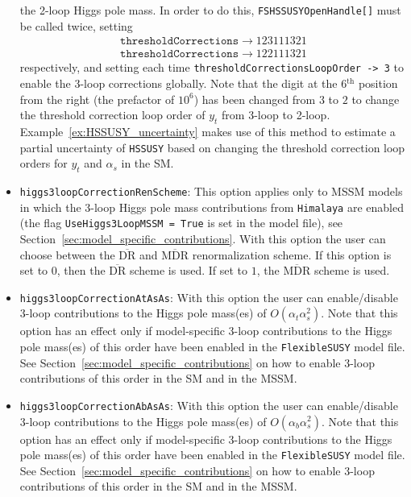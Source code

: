 \documentclass[final,3p,11pt,pdflatex]{elsarticle}
\makeatletter
\newcommand{\modelname}[1]{\texttt{#1}\@\xspace}
\newcommand{\fs}{\texttt{FlexibleSUSY}\@\xspace}
\newcommand{\HSSUSY}{\modelname{HSSUSY}}
\newcommand{\Himalaya}{\texttt{Himalaya}\@\xspace}
\newcommand{\code}[1]{\lstinline|#1|}  %
\newcommand{\ol}[1]{\overline{#1}}
\newcommand{\DRbar}{\ensuremath{\ol{\text{DR}}}\xspace}
\newcommand{\MDRbar}{\ensuremath{\ol{\text{MDR}}}\xspace}
\newcommand{\secref}[1]{Section~\ref{#1}}
\newcommand{\exref}[1]{Example~\ref{#1}}
\def\at{\alpha_t}
\def\ab{\alpha_b}
\def\as{\alpha_s}
\makeatother
\begin{document}
\begin{itemize}
\begin{example}[label=ex:HSSUSY_thresholds]
    the 2-loop Higgs pole mass.  In order to do this,
    \code{FSHSSUSYOpenHandle[]} must be called twice, setting
    \begin{align*}
      \texttt{thresholdCorrections} \rightarrow 123111321 \\
      \texttt{thresholdCorrections} \rightarrow 122111321
    \end{align*}
    respectively, and setting each time
    \code{thresholdCorrectionsLoopOrder -> 3} to enable the 3-loop
    corrections globally.  Note that the digit at the 6$^\text{th}$ position
    from the right (the prefactor of $10^6$) has been changed from $3$
    to $2$ to change the threshold correction loop order of $y_t$ from
    3-loop to 2-loop.  \exref{ex:HSSUSY_uncertainty} makes use
    of this method to estimate a partial uncertainty of
    \HSSUSY based on changing the threshold correction loop orders for
    $y_t$ and $\as$ in the SM\@.
  \end{example}

\item[\texttt{FlexibleSUSY[25]},]
  \texttt{higgs3loopCorrectionRenScheme}: This option applies only to
  MSSM models in which the 3-loop Higgs pole mass contributions from
  \Himalaya are enabled (the flag \code{UseHiggs3LoopMSSM = True} is
  set in the model file), see
  \secref{sec:model_specific_contributions}.  With this option the
  user can choose between the \DRbar and \MDRbar renormalization
  scheme.  If this option is set to $0$, then the \DRbar scheme is
  used.  If set to $1$, the \MDRbar scheme is used.

\item[\texttt{FlexibleSUSY[26]},] \texttt{higgs3loopCorrectionAtAsAs}:
  With this option the user can enable/disable 3-loop contributions to
  the Higgs pole mass(es) of $O(\at\as^2)$.  Note that this option
  has an effect only if model-specific 3-loop contributions to the
  Higgs pole mass(es) of this order have been enabled in the \fs model file.  See
  \secref{sec:model_specific_contributions} on how to enable 3-loop
  contributions of this order in the SM and in the MSSM\@.

\item[\texttt{FlexibleSUSY[27]},] \texttt{higgs3loopCorrectionAbAsAs}:
  With this option the user can enable/disable 3-loop contributions to
  the Higgs pole mass(es) of $O(\ab\as^2)$.  Note that this option
  has an effect only if model-specific 3-loop contributions to the
  Higgs pole mass(es) of this order have been enabled in the \fs model file.
  See \secref{sec:model_specific_contributions} on how to enable
  3-loop contributions of this order in the SM and in the
  MSSM\@.


\end{itemize}
\end{document}
